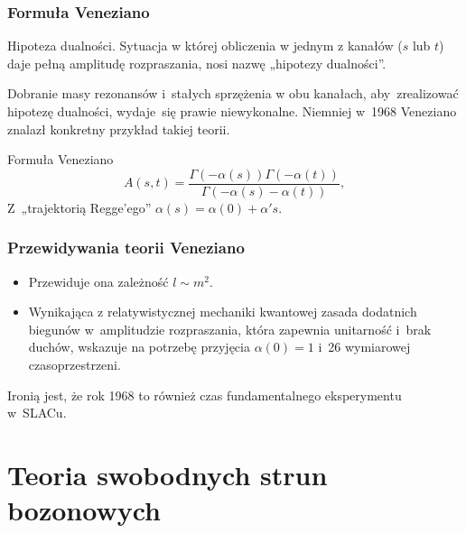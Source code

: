 \documentclass[10pt,t]{beamer}
\begin{document}
\begin{frame}
  \frametitle{Formuła Veneziano}


  Hipoteza dualności. Sytuacja w której obliczenia w jednym z kanałów ($s$
  lub $t$) daje pełną amplitudę rozpraszania, nosi nazwę „hipotezy
  dualności”.

  Dobranie masy rezonansów i~stałych sprzężenia w obu kanałach,
  aby~zrealizować hipotezę dualności, wydaje~się prawie niewykonalne.
  Niemniej w~1968 Veneziano znalazł konkretny przykład takiej teorii.

  Formuła Veneziano
  \begin{equation}
    \label{eq:O-teorii-strun-03}
    A( s, t ) =
    \frac{ \Gamma( -\alpha( s ) ) \Gamma( -\alpha( t ) ) }{ \Gamma( -\alpha( s ) - \alpha( t ) ) },
  \end{equation}
  Z~„trajektorią Regge’ego” $\alpha( s ) = \alpha( 0 ) + \alpha' s $.

\end{frame}





\begin{frame}
  \frametitle{Przewidywania teorii Veneziano}


  \begin{itemize}

  \item Przewiduje ona zależność $l \sim m^{ 2 }$.

  \item Wynikająca z relatywistycznej mechaniki kwantowej zasada
    dodatnich biegunów w~amplitudzie rozpraszania, która zapewnia
    unitarność i~brak duchów, wskazuje na potrzebę przyjęcia
    $\alpha( 0 ) = 1$ i~26 wymiarowej czasoprzestrzeni.

  \end{itemize}

  Ironią jest, że  rok 1968 to również czas fundamentalnego eksperymentu
  w~SLACu.

\end{frame}










\section{Teoria swobodnych strun bozonowych}
\end{document}

